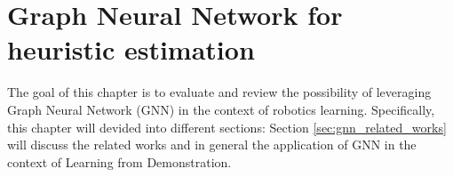 \chapter{Graph Neural Network for heuristic estimation}
The goal of this chapter is to evaluate and review the possibility of leveraging Graph Neural Network (GNN) in the context of robotics learning. Specifically, this chapter will devided into different sections: Section \ref{sec:gnn_related_works} will discuss the related works and in general the application of GNN in the context of Learning from Demonstration.

